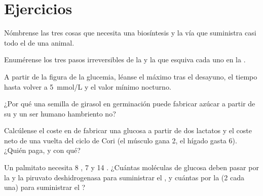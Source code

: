 \section{Ejercicios}

\begin{exercise}[$\star$]\label{exo:b1:biosyntheses-integration:1}
Nómbrense las tres cosas que necesita una biosíntesis y la vía que
suministra casi todo el  de una  animal.
\end{exercise}

\begin{exercise}[$\star$]\label{exo:b1:biosyntheses-integration:2}
Enumérense los tres pasos irreversibles de la  y la  que
esquiva cada uno en la .
\end{exercise}

\begin{exercise}[$\star$]\label{exo:b1:biosyntheses-integration:3}
A partir de la figura de la glucemia, léanse el máximo tras el desayuno, el
tiempo hasta volver a \qty{5}{mmol/L} y el valor mínimo nocturno.
\end{exercise}

\begin{exercise}[$\star$]\label{exo:b1:biosyntheses-integration:4}
¿Por qué una semilla de girasol en germinación puede fabricar azúcar a
partir de su  y un ser humano hambriento no?
\end{exercise}

\begin{exercise}[$\star\star$]\label{exo:b1:biosyntheses-integration:5}
Calcúlense el coste en  de fabricar una glucosa a partir de dos lactatos
y el coste neto de una vuelta del ciclo de Cori (el músculo gana 2, el
hígado gasta 6). ¿Quién paga, y con qué?
\end{exercise}

\begin{exercise}[$\star\star$]\label{exo:b1:biosyntheses-integration:6}
Un palmitato necesita 8 , 7  y 14 . ¿Cuántas moléculas de
glucosa deben pasar por la  y la piruvato deshidrogenasa para
suministrar el , y cuántas por la 
(2  cada una) para suministrar el ?
\end{exercise}

